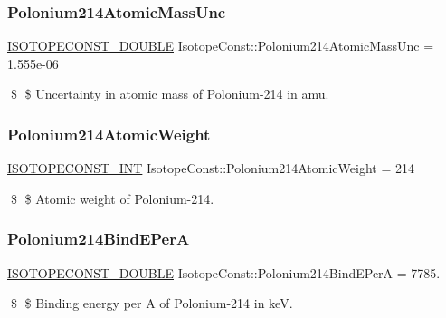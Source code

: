 \subsubsection{\texorpdfstring{Polonium214\+Atomic\+Mass\+Unc}{Polonium214AtomicMassUnc}}
{\footnotesize\ttfamily \mbox{\hyperlink{group___isotope_const-_macros_ga8f45a7272ce02c0b4c65c44636ed719a}{I\+S\+O\+T\+O\+P\+E\+C\+O\+N\+S\+T\+\_\+\+D\+O\+U\+B\+LE}} Isotope\+Const\+::\+Polonium214\+Atomic\+Mass\+Unc = 1.\+555e-\/06}

\$ \$ Uncertainty in atomic mass of Polonium-\/214 in amu. \mbox{\label{group___isotope_const-_polonium-_po214_ga87a5aef139099f50a2465e36c62d27d1}} 
\subsubsection{\texorpdfstring{Polonium214\+Atomic\+Weight}{Polonium214AtomicWeight}}
{\footnotesize\ttfamily \mbox{\hyperlink{group___isotope_const-_macros_ga5f18360b3e99483a35c32d789e62621c}{I\+S\+O\+T\+O\+P\+E\+C\+O\+N\+S\+T\+\_\+\+I\+NT}} Isotope\+Const\+::\+Polonium214\+Atomic\+Weight = 214}

\$ \$ Atomic weight of Polonium-\/214. \mbox{\label{group___isotope_const-_polonium-_po214_ga2cd1db8450dedf6d4f200f30eec6cc7a}} 
\subsubsection{\texorpdfstring{Polonium214\+Bind\+E\+PerA}{Polonium214BindEPerA}}
{\footnotesize\ttfamily \mbox{\hyperlink{group___isotope_const-_macros_ga8f45a7272ce02c0b4c65c44636ed719a}{I\+S\+O\+T\+O\+P\+E\+C\+O\+N\+S\+T\+\_\+\+D\+O\+U\+B\+LE}} Isotope\+Const\+::\+Polonium214\+Bind\+E\+PerA = 7785.}

\$ \$ Binding energy per A of Polonium-\/214 in keV. \mbox{\label{group___isotope_const-_polonium-_po214_ga24f0265b4905d1c2e9e9b27be3873517}} 
